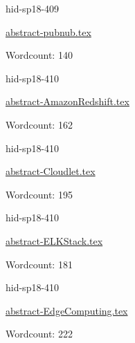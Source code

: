 

\begin{IU}

hid-sp18-409

\href{https://github.com/cloudmesh-community/hid-sp18-409/blob/master//technology/abstract-pubnub.tex}{abstract-pubnub.tex}

 

Wordcount: 140

\end{IU}



\begin{IU}

hid-sp18-410

\href{https://github.com/cloudmesh-community/hid-sp18-410/blob/master//technology/abstract-AmazonRedshift.tex}{abstract-AmazonRedshift.tex}

 

Wordcount: 162

\end{IU}



\begin{IU}

hid-sp18-410

\href{https://github.com/cloudmesh-community/hid-sp18-410/blob/master//technology/abstract-Cloudlet.tex}{abstract-Cloudlet.tex}

 

Wordcount: 195

\end{IU}



\begin{IU}

hid-sp18-410

\href{https://github.com/cloudmesh-community/hid-sp18-410/blob/master//technology/abstract-ELKStack.tex}{abstract-ELKStack.tex}

 

Wordcount: 181

\end{IU}



\begin{IU}

hid-sp18-410

\href{https://github.com/cloudmesh-community/hid-sp18-410/blob/master//technology/abstract-EdgeComputing.tex}{abstract-EdgeComputing.tex}

 

Wordcount: 222

\end{IU}

